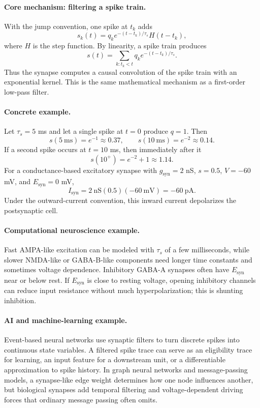 \paragraph{Core mechanism: filtering a spike train.}
With the jump convention, one spike at \(t_k\) adds
\[
s_k(t)=q_k e^{-(t-t_k)/\tau_s}H(t-t_k),
\]
where \(H\) is the step function. By linearity, a spike train produces
\[
\boxed{s(t)=\sum_{k:t_k<t}q_k e^{-(t-t_k)/\tau_s}.}
\]
Thus the synapse computes a causal convolution of the spike train with an exponential kernel. This is the same mathematical mechanism as a first-order low-pass filter.

\paragraph{Concrete example.}
Let \(\tau_s=5\) ms and let a single spike at \(t=0\) produce \(q=1\). Then
\[
s(5\ \mathrm{ms})=e^{-1}\approx0.37,\qquad
s(10\ \mathrm{ms})=e^{-2}\approx0.14.
\]
If a second spike occurs at \(t=10\) ms, then immediately after it
\[
s(10^+)=e^{-2}+1\approx1.14.
\]
For a conductance-based excitatory synapse with \(g_{\mathrm{syn}}=2\) nS, \(s=0.5\), \(V=-60\) mV, and \(E_{\mathrm{syn}}=0\) mV,
\[
I_{\mathrm{syn}}=2\ \mathrm{nS}(0.5)(-60\ \mathrm{mV})=-60\ \mathrm{pA}.
\]
Under the outward-current convention, this inward current depolarizes the postsynaptic cell.

\paragraph{Computational neuroscience example.}
Fast AMPA-like excitation can be modeled with \(\tau_s\) of a few milliseconds, while slower NMDA-like or GABA-B-like components need longer time constants and sometimes voltage dependence. Inhibitory GABA-A synapses often have \(E_{\mathrm{syn}}\) near or below rest. If \(E_{\mathrm{syn}}\) is close to resting voltage, opening inhibitory channels can reduce input resistance without much hyperpolarization; this is shunting inhibition.

\paragraph{AI and machine-learning example.}
Event-based neural networks use synaptic filters to turn discrete spikes into continuous state variables. A filtered spike trace can serve as an eligibility trace for learning, an input feature for a downstream unit, or a differentiable approximation to spike history. In graph neural networks and message-passing models, a synapse-like edge weight determines how one node influences another, but biological synapses add temporal filtering and voltage-dependent driving forces that ordinary message passing often omits.

